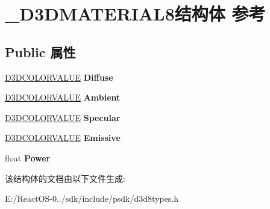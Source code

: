 \hypertarget{struct___d3_d_m_a_t_e_r_i_a_l8}{}\section{\+\_\+\+D3\+D\+M\+A\+T\+E\+R\+I\+A\+L8结构体 参考}
\label{struct___d3_d_m_a_t_e_r_i_a_l8}
\subsection*{Public 属性}
\begin{DoxyCompactItemize}
\item 
\mbox{\label{struct___d3_d_m_a_t_e_r_i_a_l8_a6d52172978a85fa1210df7115d9acc7b}} 
\hyperlink{struct___d3_d_c_o_l_o_r_v_a_l_u_e}{D3\+D\+C\+O\+L\+O\+R\+V\+A\+L\+UE} {\bfseries Diffuse}
\item 
\mbox{\label{struct___d3_d_m_a_t_e_r_i_a_l8_a7a12318881e59d7ade2d40735a97840e}} 
\hyperlink{struct___d3_d_c_o_l_o_r_v_a_l_u_e}{D3\+D\+C\+O\+L\+O\+R\+V\+A\+L\+UE} {\bfseries Ambient}
\item 
\mbox{\label{struct___d3_d_m_a_t_e_r_i_a_l8_abc307addf202c10093bda14a4f058757}} 
\hyperlink{struct___d3_d_c_o_l_o_r_v_a_l_u_e}{D3\+D\+C\+O\+L\+O\+R\+V\+A\+L\+UE} {\bfseries Specular}
\item 
\mbox{\label{struct___d3_d_m_a_t_e_r_i_a_l8_a5a3094d6148240e96477db229a12fc0b}} 
\hyperlink{struct___d3_d_c_o_l_o_r_v_a_l_u_e}{D3\+D\+C\+O\+L\+O\+R\+V\+A\+L\+UE} {\bfseries Emissive}
\item 
\mbox{\label{struct___d3_d_m_a_t_e_r_i_a_l8_a67f7d196b439a69aab111b3fd9ab804b}} 
float {\bfseries Power}
\end{DoxyCompactItemize}


该结构体的文档由以下文件生成\+:\begin{DoxyCompactItemize}
\item 
E\+:/\+React\+O\+S-\/0../sdk/include/psdk/d3d8types.\+h\end{DoxyCompactItemize}

